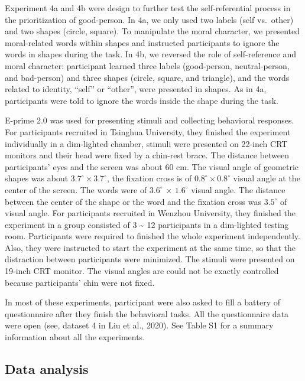 \documentclass[
  man]{apa6}
\begin{document}
Experiment 4a and 4b were design to further test the self-referential process in the prioritization of good-person. In 4a, we only used two labels (self vs.~other) and two shapes (circle, square). To manipulate the moral character, we presented moral-related words within shapes and instructed participants to ignore the words in shapes during the task. In 4b, we reversed the role of self-reference and moral character: participant learned three labels (good-person, neutral-person, and bad-person) and three shapes (circle, square, and triangle), and the words related to identity, ``self'' or ``other'', were presented in shapes. As in 4a, participants were told to ignore the words inside the shape during the task.

E-prime 2.0 was used for presenting stimuli and collecting behavioral responses. For participants recruited in Tsinghua University, they finished the experiment individually in a dim-lighted chamber, stimuli were presented on 22-inch CRT monitors and their head were fixed by a chin-rest brace. The distance between participants' eyes and the screen was about 60 cm. The visual angle of geometric shapes was about \(3.7^\circ × 3.7^\circ\), the fixation cross is of \(0.8^\circ × 0.8^\circ\) visual angle at the center of the screen. The words were of \(3.6^\circ\) × \(1.6^\circ\) visual angle. The distance between the center of the shape or the word and the fixation cross was \(3.5^\circ\) of visual angle. For participants recruited in Wenzhou University, they finished the experiment in a group consisted of 3 \textasciitilde{} 12 participants in a dim-lighted testing room. Participants were required to finished the whole experiment independently. Also, they were instructed to start the experiment at the same time, so that the distraction between participants were minimized. The stimuli were presented on 19-inch CRT monitor. The visual angles are could not be exactly controlled because participants' chin were not fixed.

In most of these experiments, participant were also asked to fill a battery of questionnaire after they finish the behavioral tasks. All the questionnaire data were open (see, dataset 4 in Liu et al., 2020). See Table S1 for a summary information about all the experiments.

\hypertarget{data-analysis}{%
\subsection{Data analysis}\label{data-analysis}}
\end{document}
